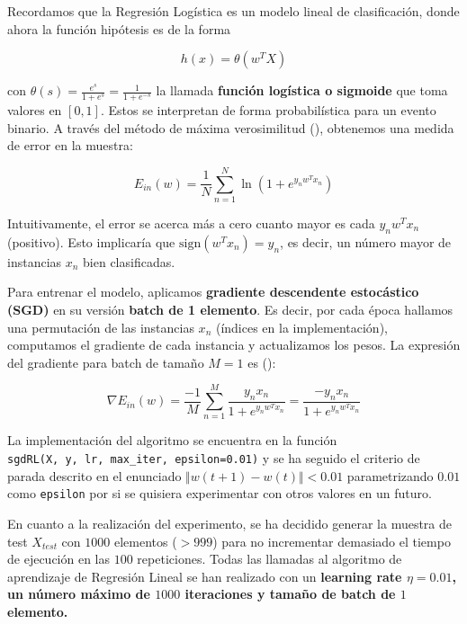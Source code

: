 \hfill \break

Recordamos que la Regresión Logística es un modelo lineal de clasificación,
donde ahora la función hipótesis es de la forma

\begin{equation}
h(x) = \theta(w^T X)
\end{equation}

con $\theta(s) = \frac{e^s}{1 + e^s} = \frac{1}{1 + e^{-s}}$ la llamada
\textbf{función logística o sigmoide} que toma valores en $[0, 1]$. Estos se
interpretan de forma probabilística para un evento binario.
A través del método de máxima verosimilitud (\cite{LFD}), obtenemos 
una medida de error en la muestra:

\begin{equation}
E_{in}(w) = \frac{1}{N} \sum_{n=1}^N \ln(1 + e^{y_n w^T x_n})
\end{equation}

Intuitivamente, el error se acerca más a cero cuanto mayor es cada
$y_n w^T x_n$ (positivo). Esto implicaría que $\text{sign}(w^T x_n) = y_n$,
es decir, un número mayor de instancias $x_n$ bien clasificadas.

Para entrenar el modelo, aplicamos \textbf{gradiente descendente estocástico (SGD)}
en su versión \textbf{batch de 1 elemento}. Es decir, por cada época hallamos una
permutación de las instancias $x_n$ (índices en la implementación), computamos
el gradiente de cada instancia y actualizamos los pesos. La expresión del gradiente
para batch de tamaño $M=1$ es (\cite{LFD}):

\begin{equation}
  \nabla E_{in}(w) = \frac{-1}{M} \sum_{n=1}^M \frac{y_nx_n}{1+e^{y_n w^T x_n}} = \frac{-y_n x_n}{1+e^{y_n w^T x_n}}
\end{equation}

La implementación del algoritmo se encuentra en la función \\
\texttt{sgdRL(X, y, lr, max_iter, epsilon=0.01)} y se ha seguido el
criterio de parada descrito en el enunciado $\Vert w(t+1) - w(t) \Vert < 0.01$
parametrizando $0.01$ como \texttt{epsilon} por si se quisiera
experimentar con otros valores en un futuro.

En cuanto a la realización del experimento, se ha decidido generar la muestra de test
$X_{test}$ con $1000$ elementos ($> 999$) para no incrementar demasiado el tiempo
de ejecución en las $100$ repeticiones. Todas las llamadas al algoritmo de aprendizaje
de Regresión Lineal se han realizado con un \textbf{learning rate $\eta = 0.01$, un número máximo
de $1000$ iteraciones y tamaño de batch de $1$ elemento.}

